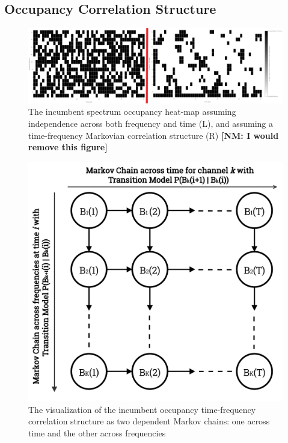 \documentclass[12pt, draftcls, onecolumn]{IEEEtran}
\newcommand{\nm}[1]{{\color{blue}\bf{[NM: #1]}}}
\begin{document}
\subsection{Occupancy Correlation Structure}\label{I.II}
\begin{figure} [htb]
    \centerline{
    \includegraphics[width = 1.0\linewidth]{figures/Minerva_Independent_Occupancy_Model.png}}
    \caption{The incumbent spectrum occupancy heat-map assuming independence across both frequency and time (L), and assuming a time-frequency Markovian correlation structure (R)
    \nm{I would remove this figure}}
    \label{fig:A.1}
\end{figure}
\begin{figure} [htb]
    \centerline{
    \includegraphics[width = 0.6\linewidth]{figures/Minerva_Occupancy_Markov_Chain_Flipped.png}}
    \caption{The visualization of the incumbent occupancy time-frequency correlation structure as two dependent Markov chains: one across time and the other across frequencies}
    \label{fig:A.3}
\end{figure}
\end{document}
